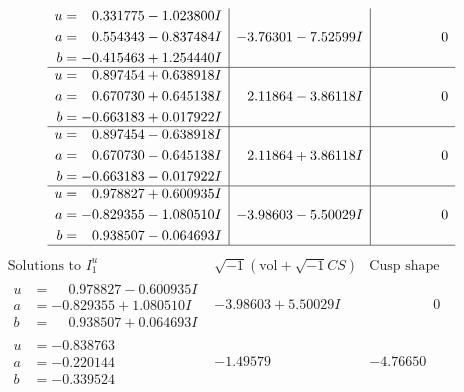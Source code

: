 \documentclass[1p]{elsarticle_modified}
\theoremstyle{definition}
\newcommand{\I}{\sqrt{-1}}
\begin{document}
$$\begin{array}{c|c|c}
\begin{aligned}
u &= \phantom{-}0.331775 - 1.023800 I \\
a &= \phantom{-}0.554343 - 0.837484 I \\
b &= -0.415463 + 1.254440 I\end{aligned}
 & -3.76301 - 7.52599 I & \phantom{-0.000000 } 0 \\ \hline\begin{aligned}
u &= \phantom{-}0.897454 + 0.638918 I \\
a &= \phantom{-}0.670730 + 0.645138 I \\
b &= -0.663183 + 0.017922 I\end{aligned}
 & \phantom{-}2.11864 - 3.86118 I & \phantom{-0.000000 } 0 \\ \hline\begin{aligned}
u &= \phantom{-}0.897454 - 0.638918 I \\
a &= \phantom{-}0.670730 - 0.645138 I \\
b &= -0.663183 - 0.017922 I\end{aligned}
 & \phantom{-}2.11864 + 3.86118 I & \phantom{-0.000000 } 0 \\ \hline\begin{aligned}
u &= \phantom{-}0.978827 + 0.600935 I \\
a &= -0.829355 - 1.080510 I \\
b &= \phantom{-}0.938507 - 0.064693 I\end{aligned}
 & -3.98603 - 5.50029 I & \phantom{-0.000000 } 0\\
 \hline 
 \end{array}$$\newpage$$\begin{array}{c|c|c}  
\text{Solutions to }I^u_{1}& \I (\text{vol} + \sqrt{-1}CS) & \text{Cusp shape}\\
 \hline 
\begin{aligned}
u &= \phantom{-}0.978827 - 0.600935 I \\
a &= -0.829355 + 1.080510 I \\
b &= \phantom{-}0.938507 + 0.064693 I\end{aligned}
 & -3.98603 + 5.50029 I & \phantom{-0.000000 } 0 \\ \hline\begin{aligned}
u &= -0.838763\phantom{ +0.000000I} \\
a &= -0.220144\phantom{ +0.000000I} \\
b &= -0.339524\phantom{ +0.000000I}\end{aligned}
 & -1.49579\phantom{ +0.000000I} & -4.76650\phantom{ +0.000000I} \\ \hline\begin{aligned}

\end{aligned}
\end{array}$$
\end{document}
